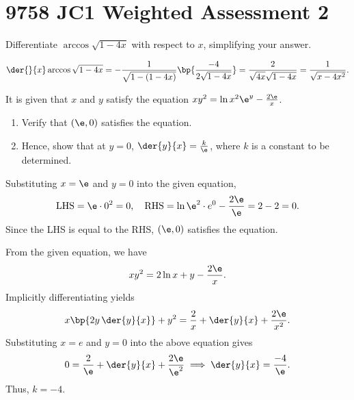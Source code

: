 \section{9758 JC1 Weighted Assessment 2}

\begin{problem}
    Differentiate $\arccos{\sqrt{1 - 4x}}$ with respect to $x$, simplifying your answer.
\end{problem}
\begin{solution}
    \[\der{}{x} \arccos{\sqrt{1 - 4x}} = -\frac1{\sqrt{1 - (1 - 4x)}} \bp{\frac{-4}{2\sqrt{1 - 4x}}} = \frac2{\sqrt{4x} \sqrt{1 - 4x}} = \frac1{\sqrt{x - 4x^2}}.\]
\end{solution}

\begin{problem}
    It is given that $x$ and $y$ satisfy the equation $xy^2 = \ln{x^2 \e^y} - \frac{2\e}{x}$.
    \begin{enumerate}
        \item Verify that $(\e, 0)$ satisfies the equation.
        \item Hence, show that at $y = 0$, $\der{y}{x} = \frac{k}{\e}$, where $k$ is a constant to be determined.
    \end{enumerate}
\end{problem}
\begin{solution}
    \begin{ppart}
        Substituting $x = \e$ and $y = 0$ into the given equation, \[\text{LHS} = \e \cdot 0^2 = 0, \quad \text{RHS} = \ln{\e^2 \cdot e^0} - \frac{2\e}{\e} = 2 - 2 = 0.\] Since the LHS is equal to the RHS, $(\e, 0)$ satisfies the equation.
    \end{ppart}
    \begin{ppart}
        From the given equation, we have \[xy^2 = 2\ln x + y - \frac{2\e}{x}.\] Implicitly differentiating yields \[x \bp{2y \, \der{y}{x}} + y^2 = \frac2{x} + \der{y}{x} + \frac{2\e}{x^2}.\] Substituting $x = e$ and $y = 0$ into the above equation gives \[0 = \frac2{\e} + \der{y}{x} + \frac{2\e}{\e^2} \implies \der{y}{x} = \frac{-4}{\e}.\] Thus, $k = -4$.
    \end{ppart}
\end{solution}


